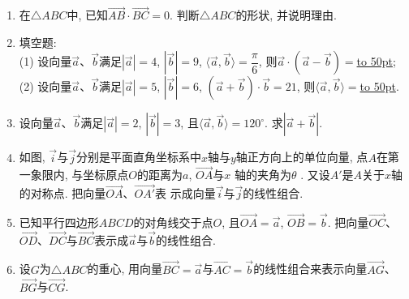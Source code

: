 \documentclass[10pt,a4paper]{article}
\newcommand{\blank}[1]{\underline{\hbox to #1pt{}}}
\begin{document}
\begin{enumerate}[1.]
\item 在$\triangle ABC$中, 已知$\overrightarrow{AB}\cdot \overrightarrow{BC}=0$. 判断$\triangle ABC$的形状, 并说明理由.
\item 填空题:\\
(1) 设向量$\overrightarrow a$、$\overrightarrow b$满足$|\overrightarrow a|=4$, $|\overrightarrow b|=9$, $\langle \overrightarrow a, \overrightarrow b\rangle =\dfrac \pi 6$, 则$\overrightarrow a\cdot (\overrightarrow a-\overrightarrow b)=$\blank{50};\\
(2) 设向量$\overrightarrow a$、$\overrightarrow b$满足$|\overrightarrow a|=5$, $|\overrightarrow b|=6$, $(\overrightarrow a+\overrightarrow b)\cdot \overrightarrow b=21$, 则$\langle \overrightarrow a, \overrightarrow b\rangle =$\blank{50}.
\item 设向量$\overrightarrow a$、$\overrightarrow b$满足$|\overrightarrow a|=2$, $|\overrightarrow b|=3$, 且$\langle \overrightarrow a, \overrightarrow b\rangle =120^\circ$. 求$|\overrightarrow a+\overrightarrow b|$.
\item 如图, $\overrightarrow i$与$\overrightarrow j$分别是平面直角坐标系中$x$轴与$y$轴正方向上的单位向量, 点$A$在第一象限内, 与坐标原点$O$的距离为$a$, $\overrightarrow{OA}$与$x$
轴的夹角为$\theta$ . 又设$A'$是$A$关于$x$轴的对称点. 把向量$\overrightarrow{OA}$、$\overrightarrow{OA'}$表
示成向量$\overrightarrow i$与$\overrightarrow j$的线性组合.
\begin{center}
\end{center}
\item 已知平行四边形$ABCD$的对角线交于点$O$, 且$\overrightarrow{OA}=\overrightarrow a$, $\overrightarrow{OB}=\overrightarrow b$. 把向量$\overrightarrow{OC}$、$\overrightarrow{OD}$、$\overrightarrow{DC}$与$\overrightarrow{BC}$表示成$\overrightarrow a$与$\overrightarrow b$的线性组合.
\item 设$G$为$\triangle ABC$的重心, 用向量$\overrightarrow{BC}=\overrightarrow a$与$\overrightarrow{AC}=\overrightarrow b$的线性组合来表示向量$\overrightarrow{AG}$、$\overrightarrow{BG}$与$\overrightarrow{CG}$. 

\end{enumerate}
\end{document}
